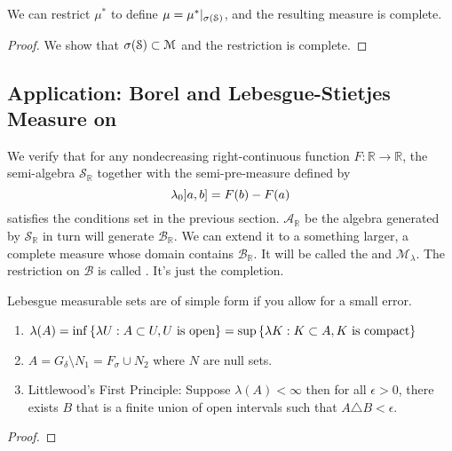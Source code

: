 \begin{thm}
    We can restrict \(\mu^{*}\) to define \(\mu= \mu^{*}|_{\sigma\pqty{\mathcal{S}}}\), and the resulting measure is complete. 
\end{thm}

\begin{proof}
    We show that \(\sigma\pqty{\mathcal{S}}\subset \mathcal{M}\) and the restriction is complete. 
\end{proof}

\subsection{Application: Borel and Lebesgue-Stietjes Measure on }

We verify that for any nondecreasing right-continuous function \(F: \mathbb{R}\to \mathbb{R}\), the semi-algebra \(\mathcal{S}_{\mathbb{R}}\) together with the semi-pre-measure defined by 
\begin{equation*}
    \lambda_{0} \linterval{a}{b} = F(b) - F(a)
\end{equation*}
satisfies the conditions set in the previous section. \(\mathcal{A}_{\mathbb{R}}\) be the algebra generated by \(\mathcal{S}_{\mathbb{R}}\) in turn will generate \(\mathcal{B}_{\mathbb{R}}\). We can extend it to a something larger, a complete measure whose domain contains \(\mathcal{B}_{\mathbb{R}}\). It will be called the  and  \(\mathcal{M}_{\lambda}\). The restriction on \(\mathcal{B}\) is called . It's just the completion.  

\begin{thm}
    Lebesgue measurable sets are of simple form if you allow for a small error.

    \begin{enumerate}
        \item \(\lambda(A) = \inf\Bqty{\lambda U:  A \subset U, U  \text{ is open}} = \sup\Bqty{\lambda K : K \subset A, K \text{ is compact}}\)
        \item \(A = G_{\delta} \setminus N_{1}= F_{\sigma} \cup N_{2}\) where \(N\) are null sets.  
        \item Littlewood's First Principle: Suppose \(\lambda(A) < \infty\) then for all \(\epsilon > 0\), there exists \(B\) that is a finite union of open intervals such that \(A \triangle B < \epsilon\). 
    \end{enumerate}
\end{thm}
\begin{proof}
    
\end{proof}

